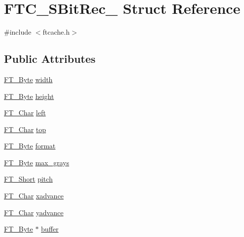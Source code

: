 \hypertarget{struct_f_t_c___s_bit_rec__}{}\section{F\+T\+C\+\_\+\+S\+Bit\+Rec\+\_\+ Struct Reference}
\label{struct_f_t_c___s_bit_rec__}


{\ttfamily \#include $<$ftcache.\+h$>$}

\subsection*{Public Attributes}
\begin{DoxyCompactItemize}
\item 
\mbox{\hyperlink{fttypes_8h_a51f26183ca0c9f4af958939648caeccd}{F\+T\+\_\+\+Byte}} \mbox{\hyperlink{struct_f_t_c___s_bit_rec___a5b92fb4f213a880f758bb87ac2ceb263}{width}}
\item 
\mbox{\hyperlink{fttypes_8h_a51f26183ca0c9f4af958939648caeccd}{F\+T\+\_\+\+Byte}} \mbox{\hyperlink{struct_f_t_c___s_bit_rec___a5953efe2aded3b184875d5e5d08cafef}{height}}
\item 
\mbox{\hyperlink{fttypes_8h_a0f851552b050883885f0a0855771f39d}{F\+T\+\_\+\+Char}} \mbox{\hyperlink{struct_f_t_c___s_bit_rec___aef273749f4fdb9943500ec6df8412a94}{left}}
\item 
\mbox{\hyperlink{fttypes_8h_a0f851552b050883885f0a0855771f39d}{F\+T\+\_\+\+Char}} \mbox{\hyperlink{struct_f_t_c___s_bit_rec___a3e558b3a04b70f00f80b862cdc94d9a2}{top}}
\item 
\mbox{\hyperlink{fttypes_8h_a51f26183ca0c9f4af958939648caeccd}{F\+T\+\_\+\+Byte}} \mbox{\hyperlink{struct_f_t_c___s_bit_rec___a3d3fcc2869ce5c95f0f63898e6cef8be}{format}}
\item 
\mbox{\hyperlink{fttypes_8h_a51f26183ca0c9f4af958939648caeccd}{F\+T\+\_\+\+Byte}} \mbox{\hyperlink{struct_f_t_c___s_bit_rec___a83958d4649a898312de9a7274550dff9}{max\+\_\+grays}}
\item 
\mbox{\hyperlink{fttypes_8h_aa7279be89046a2563cd3d4d6651fbdcf}{F\+T\+\_\+\+Short}} \mbox{\hyperlink{struct_f_t_c___s_bit_rec___a1382ec014df599e706c2c1785bc18235}{pitch}}
\item 
\mbox{\hyperlink{fttypes_8h_a0f851552b050883885f0a0855771f39d}{F\+T\+\_\+\+Char}} \mbox{\hyperlink{struct_f_t_c___s_bit_rec___a502a0bb69d973d2ae626a842eb9fefd3}{xadvance}}
\item 
\mbox{\hyperlink{fttypes_8h_a0f851552b050883885f0a0855771f39d}{F\+T\+\_\+\+Char}} \mbox{\hyperlink{struct_f_t_c___s_bit_rec___aabe767ddaf7ff62918886c6f62e9ac28}{yadvance}}
\item 
\mbox{\hyperlink{fttypes_8h_a51f26183ca0c9f4af958939648caeccd}{F\+T\+\_\+\+Byte}} $\ast$ \mbox{\hyperlink{struct_f_t_c___s_bit_rec___abe4d78fc3f411d67e7fc43f7aa21bd1d}{buffer}}
\end{DoxyCompactItemize}


